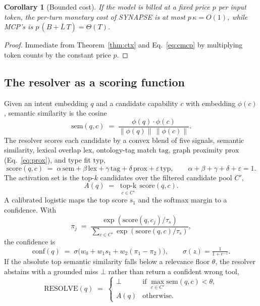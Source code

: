 \documentclass[11pt]{article}
\theoremstyle{plain}
\newtheorem{corollary}{Corollary}
\theoremstyle{definition}
\begin{document}
\begin{corollary}[Bounded cost]
\label{cor:cost}
If the model is billed at a fixed price $p$ per input token, the per-turn
monetary cost of SYNAPSE is at most $p\,\kappa = O(1)$, while MCP's is
$p\,(B+\bar L\,T) = \Theta(T)$.
\end{corollary}
\begin{proof}
Immediate from Theorem~\ref{thm:ctx} and Eq.~\eqref{eq:cmcp} by multiplying token
counts by the constant price $p$.
\end{proof}

\subsection{The resolver as a scoring function}
Given an intent embedding $q$ and a candidate capability $c$ with embedding
$\phi(c)$, semantic similarity is the cosine
\begin{equation}
\label{eq:cos}
\mathrm{sem}(q,c) \;=\; \frac{\phi(q)\cdot\phi(c)}{\lVert\phi(q)\rVert\,\lVert\phi(c)\rVert}.
\end{equation}
The resolver scores each candidate by a convex blend of five signals, semantic
similarity, lexical overlap $\mathrm{lex}$, ontology-tag match $\mathrm{tag}$,
graph proximity $\mathrm{prox}$ (Eq.~\eqref{eq:prox}), and type fit
$\mathrm{typ}$,
\begin{equation}
\label{eq:score}
\mathrm{score}(q,c) \;=\; \alpha\,\mathrm{sem} + \beta\,\mathrm{lex}
   + \gamma\,\mathrm{tag} + \delta\,\mathrm{prox} + \varepsilon\,\mathrm{typ},
\qquad \alpha+\beta+\gamma+\delta+\varepsilon = 1 .
\end{equation}
The activation set is the top-$k$ candidates over the filtered candidate pool
$C'$,
\begin{equation}
\label{eq:topk}
A(q) \;=\; \operatorname*{top\text{-}k}_{c\in C'} \, \mathrm{score}(q,c).
\end{equation}
A calibrated logistic maps the top score $s_1$ and the softmax margin to a
confidence. With
\begin{equation}
\label{eq:softmax}
\pi_j \;=\; \frac{\exp(\mathrm{score}(q,c_j)/\tau_s)}{\sum_{c\in C'} \exp(\mathrm{score}(q,c)/\tau_s)},
\end{equation}
the confidence is
\begin{equation}
\label{eq:conf}
\mathrm{conf}(q) \;=\; \sigma\!\big(w_0 + w_1 s_1 + w_2 (\pi_1 - \pi_2)\big),
\qquad \sigma(z) = \tfrac{1}{1+e^{-z}} .
\end{equation}
If the absolute top semantic similarity falls below a relevance floor $\theta$,
the resolver abstains with a grounded miss $\bot$ rather than return a confident
wrong tool,
\begin{equation}
\label{eq:resolve}
\mathrm{RESOLVE}(q) \;=\;
\begin{cases}
\bot & \text{if } \max_{c\in C'} \mathrm{sem}(q,c) < \theta,\\[2pt]
A(q) & \text{otherwise.}
\end{cases}
\end{equation}
\end{document}
